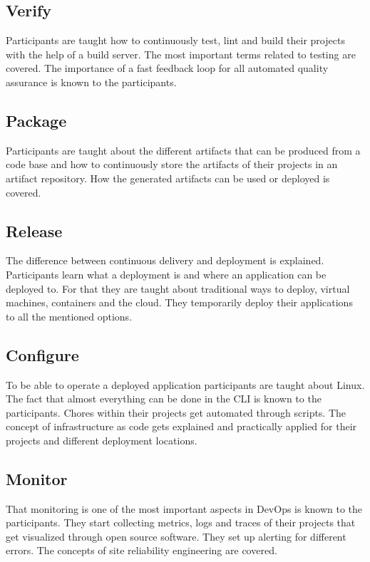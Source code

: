 \documentclass{article}
\begin{document}
\subsection{Verify}

Participants are taught how to continuously test, lint and build their
projects with the help of a build server. The most important terms related
to testing are covered. The importance of a fast feedback loop for all automated
quality assurance is known to the participants.

\subsection{Package}

Participants are taught about the different artifacts that can be produced from
a code base and how to continuously store the artifacts of their projects in an
artifact repository. How the generated artifacts can be used or deployed is
covered.

\newpage

\subsection{Release}

The difference between continuous delivery and deployment is explained.
Participants learn what a deployment is and where an application can be deployed
to. For that they are taught about traditional ways to deploy, virtual machines,
containers and the cloud. They temporarily deploy their applications to all the
mentioned options.

\subsection{Configure}

To be able to operate a deployed application participants are taught about
Linux. The fact that almost everything can be done in the CLI is known to the
participants. Chores within their projects get automated through scripts. The
concept of infrastructure as code gets explained and practically applied for
their projects and different deployment locations.

\subsection{Monitor}

That monitoring is one of the most important aspects in DevOps is known to
the participants. They start collecting metrics, logs and traces of their
projects that get visualized through open source software. They set up alerting
for different errors. The concepts of site reliability engineering are covered.
\end{document}
